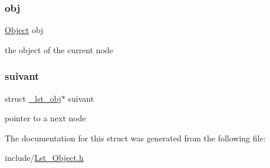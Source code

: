 \subsubsection{\texorpdfstring{obj}{obj}}
{\footnotesize\ttfamily \hyperlink{struct_object}{Object} obj}

the object of the current node \mbox{\label{struct__lst__obj_a30057e853c9335659e7e45f3052ca333}} 
\subsubsection{\texorpdfstring{suivant}{suivant}}
{\footnotesize\ttfamily struct \hyperlink{struct__lst__obj}{\+\_\+lst\+\_\+obj}$\ast$ suivant}

pointer to a next node 

The documentation for this struct was generated from the following file\+:\begin{DoxyCompactItemize}
\item 
include/\hyperlink{_lst___object_8h}{Lst\+\_\+\+Object.\+h}\end{DoxyCompactItemize}
